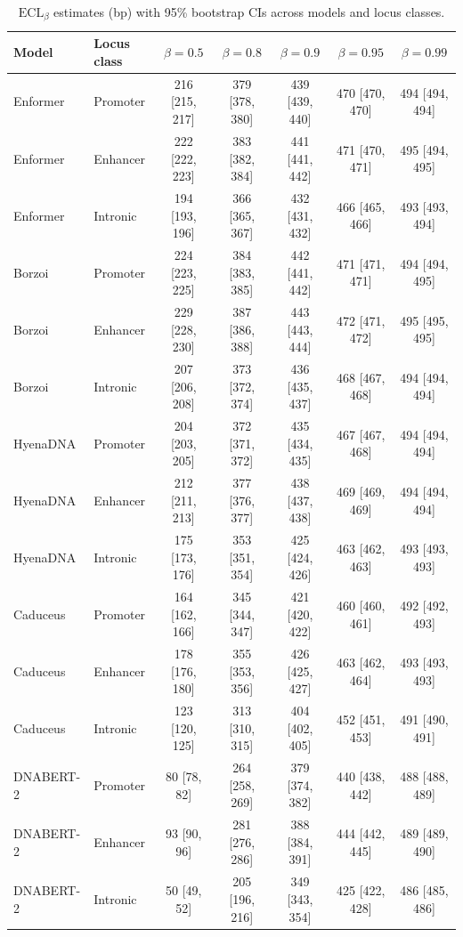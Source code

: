 \begin{table}[t]
\centering
\caption{$\mathrm{ECL}_\beta$ estimates (bp) with 95\% bootstrap CIs across models and locus classes.}
\label{tab:ecl_estimates}
\begin{tabular}{llc c c c c}
\toprule
\textbf{Model} & \textbf{Locus class} & $\beta=0.5$ & $\beta=0.8$ & $\beta=0.9$ & $\beta=0.95$ & $\beta=0.99$ \\
\midrule
Enformer & Promoter & 216 [215, 217] & 379 [378, 380] & 439 [439, 440] & 470 [470, 470] & 494 [494, 494] \\
Enformer & Enhancer & 222 [222, 223] & 383 [382, 384] & 441 [441, 442] & 471 [470, 471] & 495 [494, 495] \\
Enformer & Intronic & 194 [193, 196] & 366 [365, 367] & 432 [431, 432] & 466 [465, 466] & 493 [493, 494] \\
\midrule
Borzoi & Promoter & 224 [223, 225] & 384 [383, 385] & 442 [441, 442] & 471 [471, 471] & 494 [494, 495] \\
Borzoi & Enhancer & 229 [228, 230] & 387 [386, 388] & 443 [443, 444] & 472 [471, 472] & 495 [495, 495] \\
Borzoi & Intronic & 207 [206, 208] & 373 [372, 374] & 436 [435, 437] & 468 [467, 468] & 494 [494, 494] \\
\midrule
HyenaDNA & Promoter & 204 [203, 205] & 372 [371, 372] & 435 [434, 435] & 467 [467, 468] & 494 [494, 494] \\
HyenaDNA & Enhancer & 212 [211, 213] & 377 [376, 377] & 438 [437, 438] & 469 [469, 469] & 494 [494, 494] \\
HyenaDNA & Intronic & 175 [173, 176] & 353 [351, 354] & 425 [424, 426] & 463 [462, 463] & 493 [493, 493] \\
\midrule
Caduceus & Promoter & 164 [162, 166] & 345 [344, 347] & 421 [420, 422] & 460 [460, 461] & 492 [492, 493] \\
Caduceus & Enhancer & 178 [176, 180] & 355 [353, 356] & 426 [425, 427] & 463 [462, 464] & 493 [493, 493] \\
Caduceus & Intronic & 123 [120, 125] & 313 [310, 315] & 404 [402, 405] & 452 [451, 453] & 491 [490, 491] \\
\midrule
DNABERT-2 & Promoter & 80 [78, 82] & 264 [258, 269] & 379 [374, 382] & 440 [438, 442] & 488 [488, 489] \\
DNABERT-2 & Enhancer & 93 [90, 96] & 281 [276, 286] & 388 [384, 391] & 444 [442, 445] & 489 [489, 490] \\
DNABERT-2 & Intronic & 50 [49, 52] & 205 [196, 216] & 349 [343, 354] & 425 [422, 428] & 486 [485, 486] \\

\end{tabular}
\end{table}
